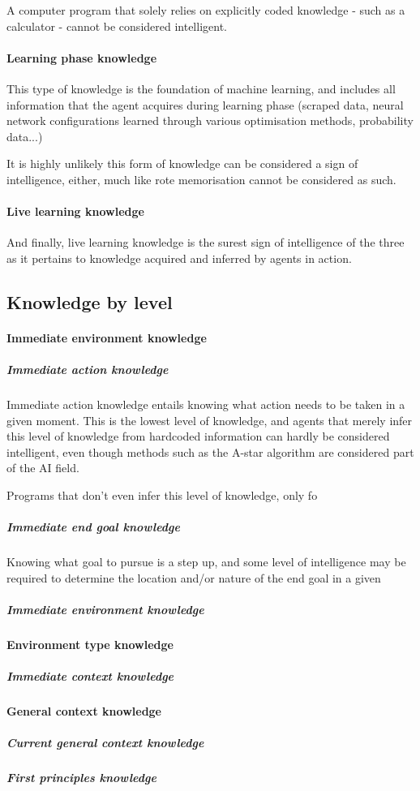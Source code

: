 \documentclass[masterthesis]{fer}
\begin{document}
A computer program that solely relies on explicitly coded knowledge - such as a calculator - cannot be considered intelligent.
\paragraph{Learning phase knowledge}
This type of knowledge is the foundation of machine learning, and includes all information that the agent acquires during learning phase (scraped data, neural network configurations learned through various optimisation methods, probability data...)

It is highly unlikely this form of knowledge can be considered a sign of intelligence, either, much like rote memorisation cannot be considered as such.
\paragraph{Live learning knowledge}
And finally, live learning knowledge is the surest sign of intelligence of the three as it pertains to knowledge acquired and inferred by agents in action.
\subsection{Knowledge by level}

\paragraph{Immediate environment knowledge}
\subparagraph{Immediate action knowledge}
Immediate action knowledge entails knowing what action needs to be taken in a given moment.
This is the lowest level of knowledge,
and agents that merely infer this level of knowledge
from hardcoded information can hardly be considered intelligent,
even though methods such as the A-star algorithm are considered part of the AI field.

Programs that don't even infer this level of knowledge, only fo
\subparagraph{Immediate end goal knowledge}
Knowing what goal to pursue is a step up, and some level of intelligence may be required to determine the location and/or nature of the end goal in a given 
\subparagraph{Immediate environment knowledge}
\paragraph{Environment type knowledge}
\subparagraph{Immediate context knowledge}
\paragraph{General context knowledge}
\subparagraph{Current general context knowledge}
\subparagraph{First principles knowledge}
\end{document}
